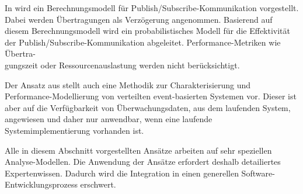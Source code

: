 In \cite{baldoni} wird ein Berechnungsmodell für Publish/Subscribe-Kommunikation vorgestellt. Dabei werden Übertragungen als Verzögerung angenommen. Basierend auf diesem Berechnungsmodell wird ein probabilistisches Modell für die Effektivität der Publish/Subscribe-Kommunikation abgeleitet. Performance-Metriken wie Übertra-\\gungszeit oder Ressourcenauslastung werden nicht berücksichtigt. \par
Der Ansatz aus \cite{Kounev2008} stellt auch eine Methodik zur Charakterisierung und Per\-formance-Modellierung von verteilten event-basierten Systemen vor. Dieser ist aber auf die Verfügbarkeit von Überwachungsdaten, aus dem laufenden System, angewiesen und daher nur anwendbar, wenn eine laufende Systemimplementierung vorhanden ist. \par
Alle in diesem Abschnitt vorgestellten Ansätze arbeiten auf sehr speziellen Analyse-Modellen. Die Anwendung der Ansätze erfordert deshalb detailiertes Expertenwissen. Dadurch wird die Integration in einen generellen Software-Entwicklungsprozess erschwert.  


